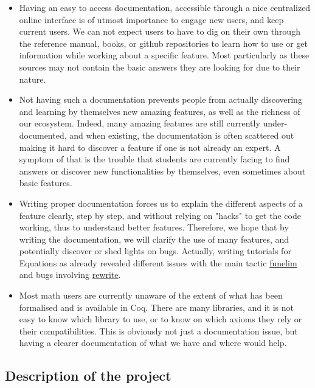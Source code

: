 \documentclass{article}[12pt]
\begin{document}
\begin{itemize}[itemsep=0pt]
  \item Having an easy to access documentation, accessible through a nice
        centralized online interface is of utmost importance to engage new
        users, and keep current users.
        We can not expect users to have to dig on their own through the
        reference manual, books, or github repositories to learn how to use or
        get information while working about a specific feature.
        Most particularly as these sources may not contain the basic answers
        they are looking for due to their nature.
  \item Not having such a documentation prevents people from actually
        discovering and learning by themselves new amazing features, as well as
        the richness of our ecosystem.
        Indeed, many amazing features are still currently under-documented, and
        when existing, the documentation is often scattered out making it hard
        to discover a feature if one is not already an expert.
        A symptom of that is the trouble that students are currently facing to
        find answers or discover new functionalities by themselves, even sometimes
        about basic features.
  \item Writing proper documentation forces us to explain the different aspects
        of a feature clearly, step by step, and without relying on "hacks" to
        get the code working, thus to understand better features.
        Therefore, we hope that by writing the documentation, we will clarify
        the use of many features, and potentially discover or shed lights on bugs.
        Actually, writing tutorials for Equations as already revealed different
        issues with the main tactic \href{https://github.com/Zimmi48/platform-docs/pull/1}{funelim}
        and bugs involving \href{https://coq.zulipchat.com/#narrow/stream/237659-Equations-devs-.26-users/topic/Bug.20funelim.20on.20Ack}{rewrite}.
  \item Most math users are currently unaware of the extent of what has been
        formalised and is available in Coq.
        There are many libraries, and it is not easy to know which library to
        use, or to know on which axioms they rely or their compatibilities.
        This is obviously not just a documentation issue, but having a clearer
        documentation of what we have and where would help.
\end{itemize}

\subsection{Description of the project}
\end{document}
